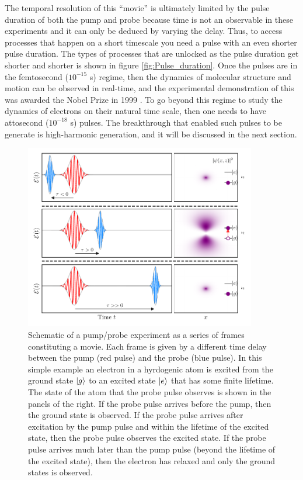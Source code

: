 The temporal resolution of this ``movie'' is ultimately limited by the pulse duration of both the pump and probe because time is not an observable in these experiments and it can only be deduced by varying the delay.  Thus, to access processes that happen on a short timescale you need a pulse with an even shorter pulse duration.  The types of processes that are unlocked as the pulse duration get shorter and shorter is shown in figure \ref{fig:Pulse_duration}.  Once the pulses are in the femtosecond ($10^{-15}$ s) regime, then the dynamics of molecular structure and motion can be observed in real-time, and the experimental demonstration of this was awarded the Nobel Prize in 1999 \cite{zewailLaserFemtochemistry1988}.  To go beyond this regime to study the dynamics of electrons on their natural time scale, then one needs to have attosecond ($10^{-18}$ s) pulses.  The breakthrough that enabled such pulses to be generate is high-harmonic generation, and it will be discussed in the next section.

\begin{figure}
	\centering
	\includegraphics[width=0.9\textwidth]{figures/Introduction/pump_probe.pdf}
	\caption[Schematic of as pump/probe experiment]{Schematic of a pump/probe experiment as a series of frames constituting a movie.  Each frame is given by a different time delay between the pump (red pulse) and the probe (blue pulse).  In this simple example an electron in a hyrdogenic atom is excited from the ground state $\ket{g}$ to an excited state $\ket{e}$ that has some finite lifetime.  The state of the atom that the probe pulse observes is shown in the panels of the right.  If the probe pulse arrives before the pump, then the ground state is observed.  If the probe pulse arrives after excitation by the pump pulse and within the lifetime of the excited state, then the probe pulse observes the excited state.  If the probe pulse arrives much later than the pump pulse (beyond the lifetime of the excited state), then the electron has relaxed and only the ground states is observed.}
	\label{fig:pump_probe}
\end{figure}

